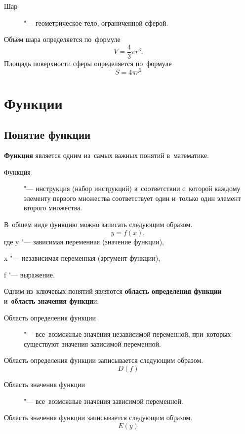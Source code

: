 \documentclass[]{scrartcl}
\begin{document}
\begin{description}
	\item[Шар] "--- геометрическое тело, ограниченной сферой.
\end{description}
Объём шара определяется по~формуле
\begin{equation}\label{eq:solid-sphere-volume}
V=\frac{4}{3}\pi r^3.
\end{equation}
Площадь поверхности сферы определяется по~формуле
\begin{equation}\label{eq:sphere-surface-square}
S=4\pi r^2
\end{equation}

\section{Функции}
\subsection{Понятие функции}
\textbf{Функция} является одним из~самых важных понятий в~математике.
\begin{description}
	\item[Функция] "--- инструкция (набор инструкций) в~соответствии с~которой каждому элементу первого множества соответствует один и~только один элемент второго множества.
\end{description}
В~общем виде функцию можно записать следующим образом.
\begin{equation}\label{function}
y=f(x),
\end{equation}
где y "--- зависимая переменная (значение функции),

x "--- независимая переменная (аргумент функции),

f "--- выражение.

Одним из~ключевых понятий являются \textbf{область определения функции} и~\textbf{область значения функци}и.
\begin{description}
	\item[Область определения функции] "--- все~возможные значения независимой переменной, при~которых существуют значения зависимой переменной.
\end{description}
Область определения функции записывается следующим образом.
\begin{equation}\label{eq:function-domain}
D(f)
\end{equation}
\begin{description}
	\item[Область значения функции] "--- все~возможные значения зависимой переменной.
\end{description}
Область значения функции записывается следующим образом.
\begin{equation}\label{eq:function-exists}
E(y)
\end{equation}
\end{document}
